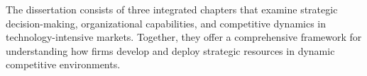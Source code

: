 \documentclass[11pt]{article}
\begin{document}

The dissertation consists of three integrated chapters that examine strategic decision-making, organizational capabilities, and competitive dynamics in technology-intensive markets. Together, they offer a comprehensive framework for understanding how firms develop and deploy strategic resources in dynamic competitive environments.

\end{document}
